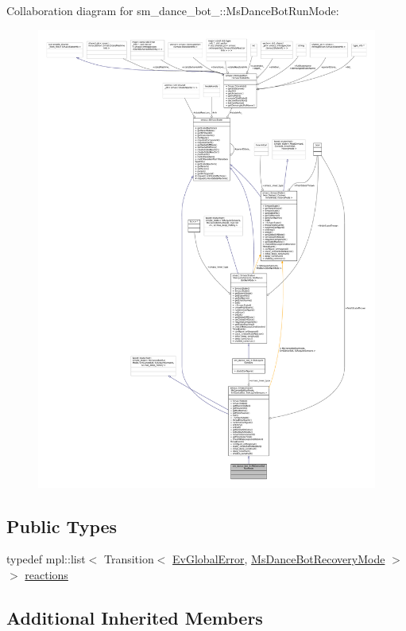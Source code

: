 Collaboration diagram for sm\+\_\+dance\+\_\+bot\+\_\+:\+:Ms\+Dance\+Bot\+Run\+Mode\+:
\nopagebreak
\begin{figure}[H]
\begin{center}
\leavevmode
\includegraphics[width=350pt]{classsm__dance__bot__3_1_1MsDanceBotRunMode__coll__graph}
\end{center}
\end{figure}
\subsection*{Public Types}
\begin{DoxyCompactItemize}
\item 
typedef mpl\+::list$<$ Transition$<$ \hyperlink{structsm__dance__bot__3_1_1EvGlobalError}{Ev\+Global\+Error}, \hyperlink{classsm__dance__bot__3_1_1MsDanceBotRecoveryMode}{Ms\+Dance\+Bot\+Recovery\+Mode} $>$ $>$ \hyperlink{classsm__dance__bot__3_1_1MsDanceBotRunMode_a41bce655ae6002d347d430b255f5b727}{reactions}
\end{DoxyCompactItemize}
\subsection*{Additional Inherited Members}


